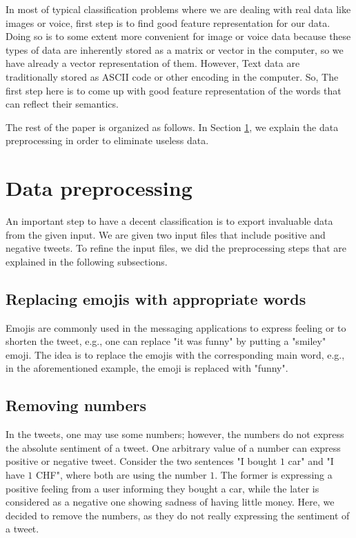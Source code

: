 \documentclass[8pt,conference,compsocconf]{IEEEtran}
\begin{document}
In most of typical classification problems where we are
dealing with real data like images or voice, first step is to find
good feature representation for our data. Doing so is to some
extent more convenient for image or voice data because these
types of data are inherently stored as a matrix or vector in
the computer, so we have already a vector representation of
them. However, Text data are traditionally stored as ASCII
code or other encoding in the computer. So, The first step
here is to come up with good feature representation of the
words that can reflect their semantics.

\par 
The rest of the paper is organized as follows. In Section \ref{sec:data}, we explain the data preprocessing in order to eliminate useless data. 


\section{Data preprocessing}\label{sec:data}
An important step to have a decent classification is to export invaluable data from the given input. We are given two input files that include positive and negative tweets. To refine the input files, we did the preprocessing steps that are explained in the following subsections.
\subsection{Replacing emojis with appropriate words}
Emojis are commonly used in the messaging applications to express feeling or to shorten the tweet, e.g., one can replace "it was funny" by putting a "smiley" emoji. The idea is to replace the emojis with the corresponding main word, e.g., in the aforementioned example, the emoji is replaced with "funny".
\subsection{Removing numbers}
In the tweets, one may use some numbers; however, the numbers do not express the absolute sentiment of a tweet. One arbitrary value of a number can express positive or negative tweet. Consider the two sentences "I bought $1$ car" and "I have $1$ CHF", where both are using the number $1$. The former is expressing a positive feeling from a user informing they bought a car, while the later is considered as a negative one showing sadness of having little money. Here, we decided to remove the numbers, as they do not really expressing the sentiment of a tweet.
\end{document}
